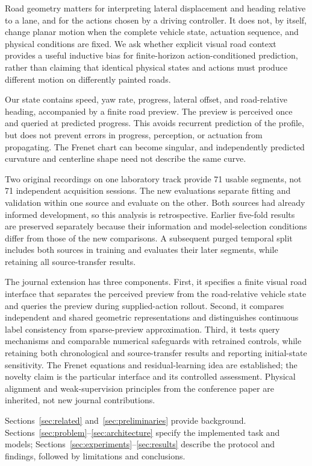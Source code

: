\documentclass[preprint,12pt]{elsarticle}
\begin{document}
Road geometry matters for interpreting lateral displacement and heading relative
to a lane, and for the actions chosen by a driving controller. It does not, by
itself, change planar motion when the complete vehicle state, actuation sequence,
and physical conditions are fixed. We ask whether explicit visual road context
provides a useful inductive bias for finite-horizon action-conditioned prediction,
rather than claiming that identical physical states and actions must produce
different motion on differently painted roads.

Our state contains speed, yaw rate, progress, lateral offset, and road-relative
heading, accompanied by a finite road preview. The preview is perceived once and
queried at predicted progress. This avoids recurrent prediction of the profile,
but does not prevent errors in progress, perception, or actuation from
propagating. The Frenet chart can become singular, and independently predicted
curvature and centerline shape need not describe the same curve.

Two original recordings on one laboratory track provide 71 usable segments, not
71 independent acquisition sessions. The new evaluations separate fitting and
validation within one source and evaluate on the other. Both sources had already
informed development, so this analysis is retrospective. Earlier five-fold
results are preserved separately because their information and model-selection
conditions differ from those of the new comparisons. A subsequent purged temporal split includes both
sources in training and evaluates their later segments, while retaining all
source-transfer results.

The journal extension has three components. First, it specifies a finite visual
road interface that separates the perceived preview from the road-relative
vehicle state and queries the preview during supplied-action rollout. Second,
it compares independent and shared geometric representations and distinguishes
continuous label consistency from sparse-preview approximation. Third, it tests
query mechanisms and comparable numerical safeguards with retrained controls,
while retaining both chronological and source-transfer results and reporting
initial-state sensitivity. The Frenet equations and residual-learning idea are
established; the novelty claim is the particular interface and its controlled
assessment. Physical alignment and weak-supervision principles from the
conference paper are inherited, not new journal contributions.

Sections~\ref{sec:related} and~\ref{sec:preliminaries} provide background.
Sections~\ref{sec:problem}--\ref{sec:architecture} specify the implemented task
and models; Sections~\ref{sec:experiments}--\ref{sec:results} describe the protocol
and findings, followed by limitations and conclusions.
\end{document}
